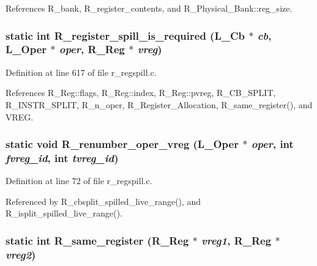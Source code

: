 References R\_\-bank, R\_\-register\_\-contents, and R\_\-Physical\_\-Bank::reg\_\-size.
\subsubsection{\setlength{\rightskip}{0pt plus 5cm}static int R\_\-register\_\-spill\_\-is\_\-required (L\_\-Cb $\ast$ {\em cb}, L\_\-Oper $\ast$ {\em oper}, \bf{R\_\-Reg} $\ast$ {\em vreg})\hspace{0.3cm}{\tt  [static]}}\label{r__regspill_8c_d51beac778398dd52f829ab3ba89a102}




Definition at line 617 of file r\_\-regspill.c.

References R\_\-Reg::flags, R\_\-Reg::index, R\_\-Reg::pvreg, R\_\-CB\_\-SPLIT, R\_\-INSTR\_\-SPLIT, R\_\-n\_\-oper, R\_\-Register\_\-Allocation, R\_\-same\_\-register(), and VREG.
\subsubsection{\setlength{\rightskip}{0pt plus 5cm}static void R\_\-renumber\_\-oper\_\-vreg (L\_\-Oper $\ast$ {\em oper}, int {\em fvreg\_\-id}, int {\em tvreg\_\-id})\hspace{0.3cm}{\tt  [static]}}\label{r__regspill_8c_0c4816c3203c41f8eb51c8eeb17332a0}




Definition at line 72 of file r\_\-regspill.c.

Referenced by R\_\-cbsplit\_\-spilled\_\-live\_\-range(), and R\_\-isplit\_\-spilled\_\-live\_\-range().
\subsubsection{\setlength{\rightskip}{0pt plus 5cm}static int R\_\-same\_\-register (\bf{R\_\-Reg} $\ast$ {\em vreg1}, \bf{R\_\-Reg} $\ast$ {\em vreg2})\hspace{0.3cm}{\tt  [static]}}\label{r__regspill_8c_18cf7a10e3b80ddef9146001b566a570}





